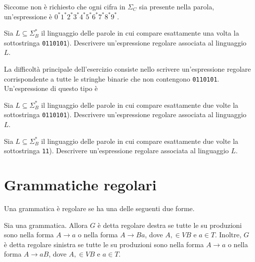 \begin{Answer}
Siccome non è richiesto che ogni cifra in $\Sigma_{C}$ sia presente nella parola, un'espressione è $0^{*}1^{*}2^{*}3^{*}4^{*}5^{*}6^{*}7^{*}8^{*}9^{*}$.
\end{Answer}


\begin{Exercise}[label=re-1-101]
Sia $L\subseteq \Sigma_{B}^{*}$ il linguaggio delle parole in cui compare esattamente una volta la sottostringa
\texttt{0110101}).
Descrivere un'espressione regolare associata al linguaggio $L$.
\end{Exercise}

\begin{Answer}
La difficoltà principale dell'esercizio consiste nello scrivere un'espressione regolare corrispondente a tutte le
stringhe binarie che non contengono \texttt{0110101}.
Un'espressione di questo tipo è
\end{Answer}

\begin{Exercise}[label=re-2-101]
Sia $L\subseteq \Sigma_{B}^{*}$ il linguaggio delle parole in cui compare esattamente due volte la sottostringa
\texttt{0110101}).
Descrivere un'espressione regolare associata al linguaggio $L$.
\end{Exercise}

\begin{Exercise}[label=re-2-11]
Sia $L\subseteq \Sigma_{B}^{*}$ il linguaggio delle parole in cui compare esattamente due volte la sottostringa
\texttt{11}).
Descrivere un'espressione regolare associata al linguaggio $L$.
\end{Exercise}


\section{Grammatiche regolari}\label{sec:grammatiche-regolari}

Una grammatica è regolare se ha una delle seguenti due forme.


\begin{definition}\label{def:grammatica-regolare-destra}
Sia \gramm una grammatica.
Allora $G$ è detta regolare destra se tutte le su produzioni sono nella forma $A \to a$ o nella forma $A \to Ba$, dove
$A, \in VB$  e $a\in T$.
Inoltre, $G$ è detta regolare sinistra se tutte le su produzioni sono nella forma $A \to a$ o nella forma $A \to aB$, dove
$A, \in VB$  e $a\in T$.
\end{definition}


